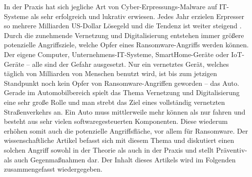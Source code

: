 In der Praxis hat sich jegliche Art von Cyber-Erpressungs-Malware auf IT-Systeme 
als sehr erfolgreich und lukrativ erwiesen. Jedes Jahr erzielen Erpresser so 
mehrere Milliarden US-Dollar Lösegeld und die Tendenz ist weiter steigend \cite[vgl.]{C..24.05.2020}. 
Durch die zunehmende Vernetzung und Digitalisierung entstehen immer größere 
potenzielle Angriffsziele, welche Opfer eines Ransomware-Angriffs werden können. 
Der eigene Computer, Unternehmens-IT-Systeme, SmartHome-Geräte oder IoT-Geräte – 
alle sind der Gefahr ausgesetzt. Nur ein vernetztes Gerät, welches täglich von 
Milliarden von Menschen benutzt wird, ist bis zum jetzigen Standpunkt noch kein 
Opfer von Ransomware-Angriffen geworden – das Auto. Gerade im Automobilbereich 
spielt das Thema Vernetzung und Digitalisierung eine sehr große Rolle und man 
strebt das Ziel eines vollständig vernetzten Straßenverkehrs an. Ein Auto muss 
mittlerweile mehr können als nur fahren und besteht aus sehr vielen softwaregesteuerten 
Komponenten. Diese wiederum erhöhen somit auch die potenzielle Angriffsfläche, vor 
allem für Ransomware. 
\newline
Der wissenschaftliche Artikel \cite{M.Wolf.2017} befasst sich mit diesem Thema und diskutiert 
einen solchen Angriff sowohl in der Theorie als auch in der Praxis und stellt Präventiv- 
als auch Gegenmaßnahmen dar. Der Inhalt dieses Artikels wird im Folgenden zusammengefasst 
wiedergegeben. 
